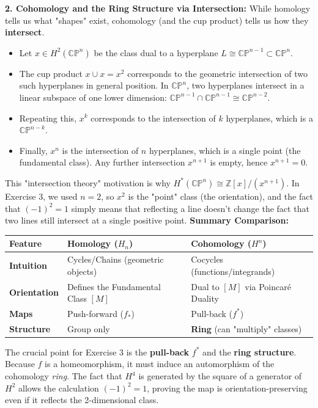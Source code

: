 \begin{remark}
\textbf{2. Cohomology and the Ring Structure via Intersection:}
While homology tells us what "shapes" exist, cohomology (and the cup product) tells us how they \textbf{intersect}.
\begin{itemize}
    \item Let $x \in H^2(\mathbb{CP}^n)$ be the class dual to a hyperplane $L \cong \mathbb{CP}^{n-1} \subset \mathbb{CP}^n$.
    \item The cup product $x \cup x = x^2$ corresponds to the geometric intersection of two such hyperplanes in general position. In $\mathbb{CP}^n$, two hyperplanes intersect in a linear subspace of one lower dimension: $\mathbb{CP}^{n-1} \cap \mathbb{CP}^{n-1} \cong \mathbb{CP}^{n-2}$.
    \item Repeating this, $x^k$ corresponds to the intersection of $k$ hyperplanes, which is a $\mathbb{CP}^{n-k}$.
    \item Finally, $x^n$ is the intersection of $n$ hyperplanes, which is a single point (the fundamental class). Any further intersection $x^{n+1}$ is empty, hence $x^{n+1} = 0$.
\end{itemize}
This "intersection theory" motivation is why $H^*(\mathbb{CP}^n) \cong \mathbb{Z}[x]/(x^{n+1})$. In Exercise 3, we used $n=2$, so $x^2$ is the "point" class (the orientation), and the fact that $(-1)^2 = 1$ simply means that reflecting a line doesn't change the fact that two lines still intersect at a single positive point.
\textbf{Summary Comparison:}
\begin{center}
\begin{tabular}{|l|p{4cm}|p{5cm}|}
\hline
\textbf{Feature} & \textbf{Homology ($H_n$)} & \textbf{Cohomology ($H^n$)} \\ \hline
\textbf{Intuition} & Cycles/Chains (geometric objects) & Cocycles (functions/integrands) \\ \hline
\textbf{Orientation} & Defines the Fundamental Class $[M]$ & Dual to $[M]$ via Poincaré Duality \\ \hline
\textbf{Maps} & Push-forward ($f_*$) & Pull-back ($f^*$) \\ \hline
\textbf{Structure} & Group only & \textbf{Ring} (can "multiply" classes) \\ \hline
\end{tabular}
\end{center}

The crucial point for Exercise 3 is the \textbf{pull-back} $f^*$ and the \textbf{ring structure}. Because $f$ is a homeomorphism, it must induce an automorphism of the cohomology \textit{ring}. The fact that $H^4$ is generated by the square of a generator of $H^2$ allows the calculation $(-1)^2 = 1$, proving the map is orientation-preserving even if it reflects the 2-dimensional class.
\end{remark}

